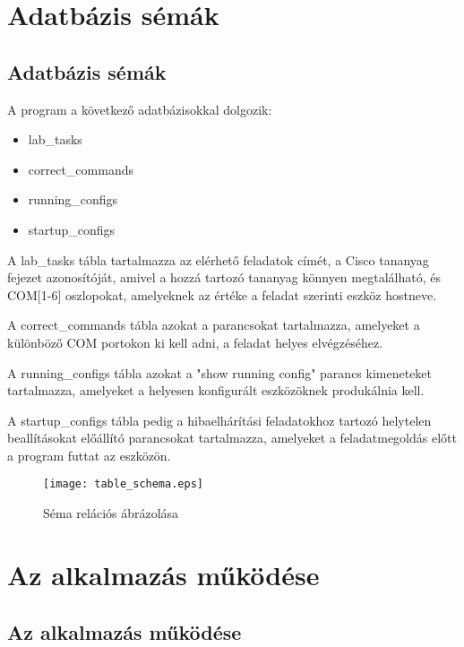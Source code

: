 \documentclass[12pt]{report}
\begin{document}
\chapter{Adatbázis sémák}
\section{Adatbázis sémák}


A program a következő adatbázisokkal dolgozik:

\singlespacing
\begin{itemize}
    \item lab\_tasks
    \item correct\_commands
    \item running\_configs
    \item startup\_configs
\end{itemize}

\onehalfspacing

A lab\_tasks tábla tartalmazza az elérhető feladatok címét, a Cisco tananyag fejezet azonosítóját, amivel a hozzá tartozó tananyag könnyen megtalálható, és COM[1-6] oszlopokat, amelyeknek az értéke a feladat szerinti eszköz hostneve.

A correct\_commands tábla azokat a parancsokat tartalmazza, amelyeket a különböző COM portokon ki kell adni, a feladat helyes elvégzéséhez.

A running\_configs tábla azokat a "show running config" parancs kimeneteket tartalmazza, amelyeket a helyesen konfigurált eszközöknek produkálnia kell.


A startup\_configs tábla pedig a hibaelhárítási feladatokhoz tartozó helytelen beallításokat előállító parancsokat tartalmazza, amelyeket a feladatmegoldás előtt a program futtat az eszközön.

\begin{figure}[h]
    \centering
    \texttt{[image: table\_schema.eps]}
    \caption{Séma relációs ábrázolása}
\end{figure}

\chapter{Az alkalmazás működése}
\section{Az alkalmazás működése}
\end{document}
